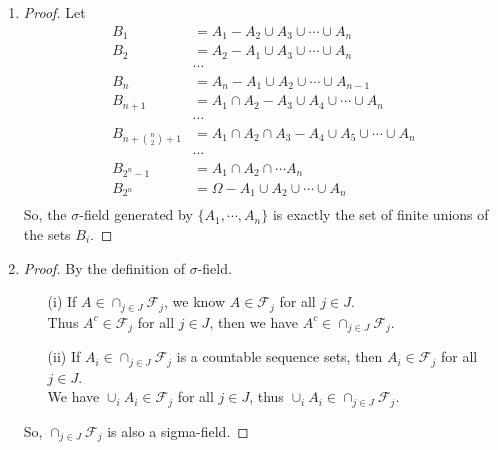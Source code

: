 \documentclass{article}
\begin{document}
\begin{enumerate}
        \item \begin{proof}
            Let \begin{align*}
                B_1 &= A_1 - A_2 \cup A_3 \cup \cdots \cup A_n \\
                B_2 &= A_2 - A_1 \cup A_3 \cup \cdots \cup A_n \\
                    &\cdots \\
                B_n &= A_n - A_1 \cup A_2 \cup \cdots \cup A_{n-1}\\
                B_{n+1} &= A_1 \cap A_2 - A_3 \cup A_4 \cup \cdots \cup A_n\\
                    &\cdots \\
                B_{n+{n \choose 2}+1} &= A_1 \cap A_2 \cap A_3 - A_4 \cup A_5 \cup \cdots \cup A_n\\
                    &\cdots \\
                B_{2^n-1} &= A_1 \cap A_2 \cap \cdots A_n\\
                B_{2^n} &= \Omega - A_1 \cup A_2 \cup \cdots \cup A_n\\
            \end{align*}
            So, the $\sigma$-field generated by $\{A_1, \cdots, A_n\}$ is exactly the set of finite unions of the sets $B_i$.
        \end{proof}
    
        \item \begin{proof}
            By the definition of $\sigma$-field.\\
            \begin{itemize}
                \item[(i)] If $A \in \cap_{j \in J}\mathcal{F}_j$, we know $A \in \mathcal{F}_j$ for all $j \in J$.\\
                            Thus $A^c \in \mathcal{F}_j$ for all $j \in J$, then we have $A^c \in \cap_{j \in J}\mathcal{F}_j$.\
                \item[(ii)] If $A_i \in \cap_{j \in J}\mathcal{F}_j$ is a countable sequence sets, then $A_i \in \mathcal{F}_j$ for all $j \in J$.\\
                            We have $\cup_i A_i \in \mathcal{F}_j$ for all $j \in J$, thus $\cup_i A_i \in \cap_{j \in J}\mathcal{F}_j$.
            \end{itemize}
            So, $\cap_{j \in J}\mathcal{F}_j$ is also a sigma-field.
        \end{proof}


\end{enumerate}
\end{document}
